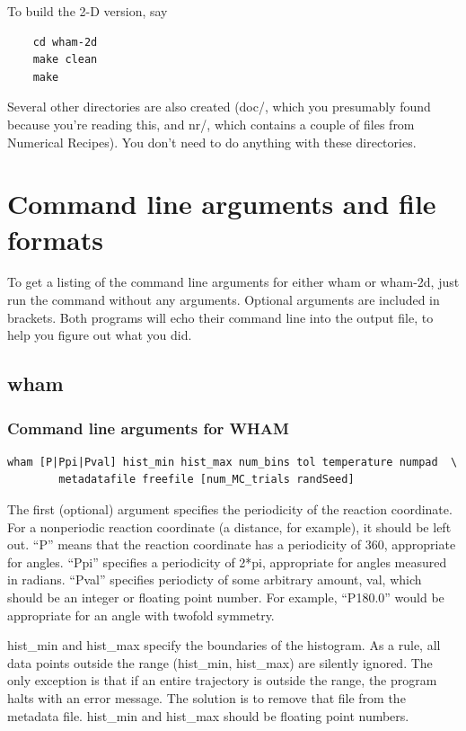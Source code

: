 \documentclass[12pt]{article}
\begin{document}
To build the 2-D version,  say

\begin{verbatim}
    cd wham-2d
    make clean
    make
\end{verbatim}

Several other directories are also created (doc/, which you presumably found
because you're reading this, and nr/, which contains a couple of files from
Numerical Recipes).  You don't need to do anything with these directories.

\section{Command line arguments and file formats}

To get a listing of the command line arguments for either wham or wham-2d,
just run the command without any arguments.  Optional arguments are
included in brackets.  Both programs will echo their command line into the
output file, to help you figure out what you did.

\subsection{wham}

\subsubsection{Command line arguments for WHAM}

\begin{verbatim}
wham [P|Ppi|Pval] hist_min hist_max num_bins tol temperature numpad  \
        metadatafile freefile [num_MC_trials randSeed]
\end{verbatim}

The first (optional) argument specifies the periodicity of the reaction
coordinate.  For a nonperiodic reaction coordinate (a distance, for
example), it should be left out.  ``P'' means that the reaction coordinate
has a periodicity of 360, appropriate for angles. ``Ppi'' specifies a
periodicity of 2*pi, appropriate for angles measured in radians.  ``Pval''
specifies periodicty of some arbitrary amount, val, which should be an
integer or floating point number.  For example, ``P180.0'' would be
appropriate for an angle with twofold symmetry. 

hist\_min and hist\_max specify the boundaries of the histogram.  As a rule,
all data points outside the range (hist\_min, hist\_max) are silently
ignored.  The only exception is that if an entire trajectory is outside the
range, the program halts with an error message.  The solution is to remove
that file from the metadata file.  hist\_min and hist\_max should be floating
point numbers.
\end{document}
